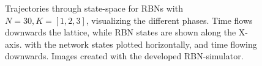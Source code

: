 \begin{figure}
  \caption[Trajectories through state space for RBNs with different connectivities] {
    Trajectories through state-space for RBNs with $N=30, K=[1,2,3]$, visualizing the different phases.
    Time flows downwards the lattice, while RBN states are shown along the X-axis.
    with the network states plotted horizontally, and time flowing downwards.
    Images created with the developed RBN-simulator.
  }
  \label{figure:rbn-phases}
\end{figure}

